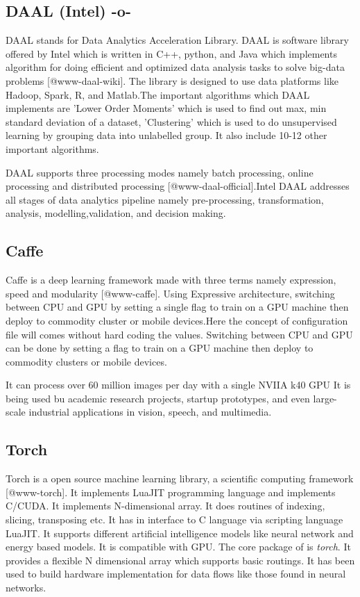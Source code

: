 \subsection{DAAL (Intel) -o-}

DAAL stands for Data Analytics Acceleration Library. DAAL is software
library offered by Intel which is written in C++, python, and Java
which implements algorithm for doing efficient and optimized data
analysis tasks to solve big-data problems [@www-daal-wiki]. The
library is designed to use data platforms like Hadoop, Spark, R, and
Matlab.The important algorithms which DAAL implements are 'Lower Order
Moments' which is used to find out max, min standard deviation of a
dataset, 'Clustering' which is used to do unsupervised learning by
grouping data into unlabelled group. It also include 10-12 other
important algorithms.

DAAL supports three processing modes namely batch processing, online
processing and distributed processing [@www-daal-official].Intel
DAAL addresses all stages of data analytics pipeline namely
pre-processing, transformation, analysis, modelling,validation, and
decision making.


    
    
\subsection{Caffe}

Caffe is a deep learning framework made with three terms namely
expression, speed and modularity [@www-caffe]. Using Expressive
architecture, switching between CPU and GPU by setting a single flag
to train on a GPU machine then deploy to commodity cluster or mobile
devices.Here the concept of configuration file will comes without hard
coding the values. Switching between CPU and GPU can be done by
setting a flag to train on a GPU machine then deploy to commodity
clusters or mobile devices.

It can process over 60 million images per day with a single NVIIA k40
GPU It is being used bu academic research projects, startup
prototypes, and even large-scale industrial applications in vision,
speech, and multimedia.
    
\subsection{Torch}

Torch is a open source machine learning library, a scientific
computing framework [@www-torch]. It implements LuaJIT
programming language and implements C/CUDA. It implements
N-dimensional array. It does routines of indexing, slicing,
transposing etc. It has in interface to C language via scripting
language LuaJIT. It supports different artificial intelligence models
like neural network and energy based models. It is compatible with
GPU.  The core package of is \textit{torch}. It provides a flexible N
dimensional array which supports basic routings. It has been used to
build hardware implementation for data flows like those found in
neural networks.
    
